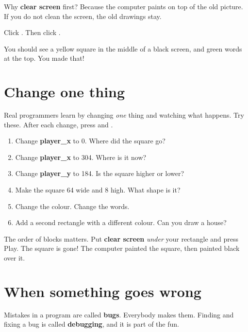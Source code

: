 Why \textbf{clear screen} first? Because the computer paints on top of the old
picture. If you do not clean the screen, the old drawings stay.

\begin{prgmission}
Click . Then click .

You should see a yellow square in the middle of a black screen, and green words
at the top. You made that!
\end{prgmission}

\section{Change one thing}

Real programmers learn by changing \emph{one} thing and watching what happens.
Try these. After each change, press  and .

\begin{prgtry}
\begin{enumerate}
  \item Change \textbf{player\_x} to 0. Where did the square go?
  \item Change \textbf{player\_x} to 304. Where is it now?
  \item Change \textbf{player\_y} to 184. Is the square higher or lower?
  \item Make the square 64 wide and 8 high. What shape is it?
  \item Change the colour. Change the words.
  \item Add a second rectangle with a different colour. Can you draw a house?
\end{enumerate}
\end{prgtry}

\begin{prgwarn}
The order of blocks matters. Put \textbf{clear screen} \emph{under} your
rectangle and press Play. The square is gone! The computer painted the square,
then painted black over it.
\end{prgwarn}

\section{When something goes wrong}

Mistakes in a program are called \textbf{bugs}. Everybody makes them. Finding
and fixing a bug is called \textbf{debugging}, and it is part of the fun.


